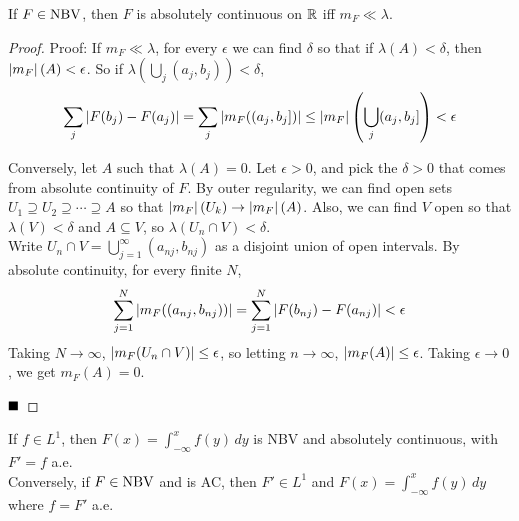\begin{lemma}
    If $F \in \tt{NBV}$, then $F$ is absolutely continuous on $\R$ iff $m_F \ll \lambda$.
\end{lemma}
\begin{proof}{Proof:}
    If $m_F \ll \lambda$, for every $\epsilon$ we can find $\delta$ so that if $\lambda(A) < \delta$, then $\abs{m_F}(A) < \epsilon$. So if $\lambda\left(\bigcup_j (a_j, b_j)\right) < \delta$,
    \[ \sum_j \abs{F(b_j) - F(a_j)} = \sum_j \abs{m_F((a_j, b_j])} \leq \abs{m_F}\left(\bigcup_j (a_j, b_j]\right) < \epsilon \]

    Conversely, let $A$ such that $\lambda(A) = 0$. Let $\epsilon > 0$, and pick the $\delta > 0$ that comes from absolute continuity of $F$. By outer regularity, we can find open sets $U_1 \supseteq U_2 \supseteq \cdots \supseteq A$ so that $\abs{m_F}(U_k) \to \abs{m_F}(A)$.
    Also, we can find $V$ open so that $\lambda(V) < \delta$ and $A \subseteq V$, so $\lambda(U_n \cap V) < \delta$.\\

    Write $U_n \cap V = \bigcup_{j = 1}^{\infty} (a_{nj}, b_{nj})$ as a disjoint union of open intervals. By absolute continuity, for every finite $N$,
    \[ \sum_{j = 1}^{N} \abs{m_F((a_{nj}, b_{nj}))} = \sum_{j = 1}^{N} \abs{F(b_{nj}) - F(a_{nj})} < \epsilon \]
    Taking $N \to \infty$, $\abs{m_F(U_n \cap V)} \leq \epsilon$, so letting $n \to \infty$, $\abs{m_F(A)} \leq \epsilon$. Taking $\epsilon \to 0$, we get $m_F(A) = 0$.

    $\qed$
\end{proof}

\begin{lemma}
    If $f \in L^1$, then $F(x) = \int_{-\infty}^{x} f(y)\, dy$ is NBV and absolutely continuous, with $F' = f$ a.e.\\

    Conversely, if $F \in \tt{NBV}$ and is AC, then $F' \in L^1$ and $F(x) = \int_{-\infty}^{x} f(y)\, dy$ where $f = F'$ a.e.
\end{lemma}

